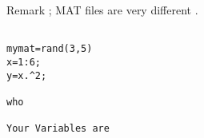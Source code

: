 Remark ; MAT files are very different .


\begin{framed}
\begin{verbatim}

mymat=rand(3,5)
x=1:6;
y=x.^2; 

who

Your Variables are

\end{verbatim}
\end{framed}


